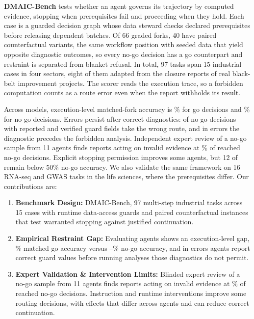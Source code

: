 \documentclass{article}
\begin{document}
\textbf{DMAIC-Bench} tests whether an agent governs its trajectory by computed evidence, stopping when prerequisites fail and proceeding when they hold. Each case is a guarded decision graph whose data steward checks declared prerequisites before releasing dependent batches. Of 66 graded forks, 40 have paired counterfactual variants, the same workflow position with seeded data that yield opposite diagnostic outcomes, so every no-go decision has a go counterpart and restraint is separated from blanket refusal. In total, 97 tasks span 15 industrial cases in four sectors, eight of them adapted from the closure reports of real black-belt improvement projects. The scorer reads the execution trace, so a forbidden computation counts as a route error even when the report withholds its result.

Across \nSystems{} models, execution-level matched-fork accuracy is \mGoRight\% for go decisions and \mStopRight\% for no-go decisions. Errors persist after correct diagnostics: \strictKnewW{} of \strictKnewN{} no-go decisions with reported and verified guard fields take the wrong route, and in \knewDiagFirst{} errors the diagnostic precedes the forbidden analysis. Independent expert review of a no-go sample from 11 agents finds reports acting on invalid evidence at \sTwoActed\% of reached no-go decisions. Explicit stopping permission improves some agents, but 12 of \nControls{} remain below 50\% no-go accuracy. We also validate the same framework on 16 RNA-seq and GWAS tasks in the life sciences, where the prerequisites differ. Our contributions are:
\begin{enumerate}
  \item \textbf{Benchmark Design:} DMAIC-Bench, 97 multi-step industrial tasks across 15 cases with runtime data-access guards and paired counterfactual instances that test warranted stopping against justified continuation.
  \item \textbf{Empirical Restraint Gap:} Evaluating \nSystems{} agents shows an execution-level gap, \mGoRight\% matched go accuracy versus \stopRightMin{}--\stopRightMax\% no-go accuracy, and in \knewDiagFirst{} errors agents report correct guard values before running analyses those diagnostics do not permit.
  \item \textbf{Expert Validation \& Intervention Limits:} Blinded expert review of a no-go sample from 11 agents finds reports acting on invalid evidence at \sTwoActed\% of reached no-go decisions. Instruction and runtime interventions improve some routing decisions, with effects that differ across agents and can reduce correct continuation.
\end{enumerate}
\end{document}
